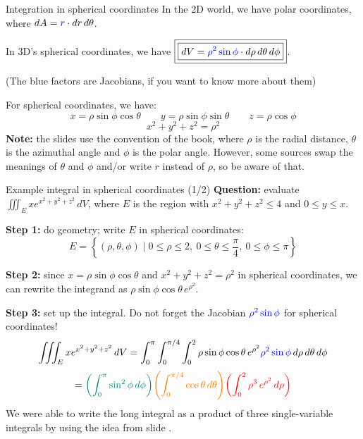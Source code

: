 \begin{frame}{Integration in spherical coordinates}
    In the 2D world, we have polar coordinates, where $dA=\textcolor{blue}{r}\cdot dr\,d\theta$.

    \pause In 3D's spherical coordinates, we have $\boxed{\boxed{dV=\textcolor{blue}{\rho^2\sin\phi}\cdot d\rho\,d\theta \,d\phi}}$.

    {\scriptsize(The blue factors are Jacobians, if you want to know more about them)}

    \pause For spherical coordinates, we have:
        \[\boxed{x=\rho\sin\phi\cos\theta \qquad y=\rho\sin\phi\sin\theta \qquad z=\rho\cos\phi}\]
        \[\boxed{x^2+y^2+z^2=\rho^2}\]
    \pause\textbf{Note:} the slides use the convention of the book, where $\rho$ is the radial distance, $\theta$ is the azimuthal angle and $\phi$ is the polar angle. However, some sources swap the meanings of $\theta$ and $\phi$ and/or write $r$ instead of $\rho$, so be aware of that.
\end{frame}

\begin{frame}{Example integral in spherical coordinates (1/2)}
    \footnotesize
    \textbf{Question:} evaluate $\iiint_E xe^{x^2+y^2+z^2}\,dV$, where $E$ is the region with $x^2+y^2+z^2\leq4$ and $0\leq y\leq x$.

    \pause\textbf{Step 1:} do geometry; write $E$ in spherical coordinates:
    \[E=\left\{(\rho,\theta,\phi) \mid 0\leq\rho\leq2,~0\leq\theta\leq\frac{\pi}{4},~0\leq\phi\leq\pi\right\}\]

    \pause\textbf{Step 2:} since $x=\rho\sin\phi\cos\theta$ and $x^2+y^2+z^2=\rho^2$ in spherical coordinates, we can rewrite the integrand as $\rho\sin\phi\cos\theta \,e^{\rho^2}$.

    \pause\textbf{Step 3:} set up the integral. Do not forget the Jacobian $\textcolor{blue}{\rho^2\sin\phi}$ for spherical coordinates!
    \[\iiint_E xe^{x^2+y^2+z^2}\,dV = \int_0^{\pi}\int_0^{\pi/4}\int_0^2 \rho\sin\phi\cos\theta\,e^{\rho^2}\textcolor{blue}{\rho^2\sin\phi}\,d\rho\,d\theta\,d\phi\]
    \[=\textcolor{teal}{\left(\int_{0}^{\pi}\sin^2\phi\,d\phi\right)}\textcolor{orange}{\left(\int_0^{\pi/4}\cos\theta\,d\theta\right)}\textcolor{red}{\left(\int_0^2\rho^3\,e^{\rho^2}\,d\rho\right)}
 \]
    We were able to write the long integral as a product of three single-variable integrals by using the idea from slide \blue{\ref{integraltrick}}.
\end{frame}

